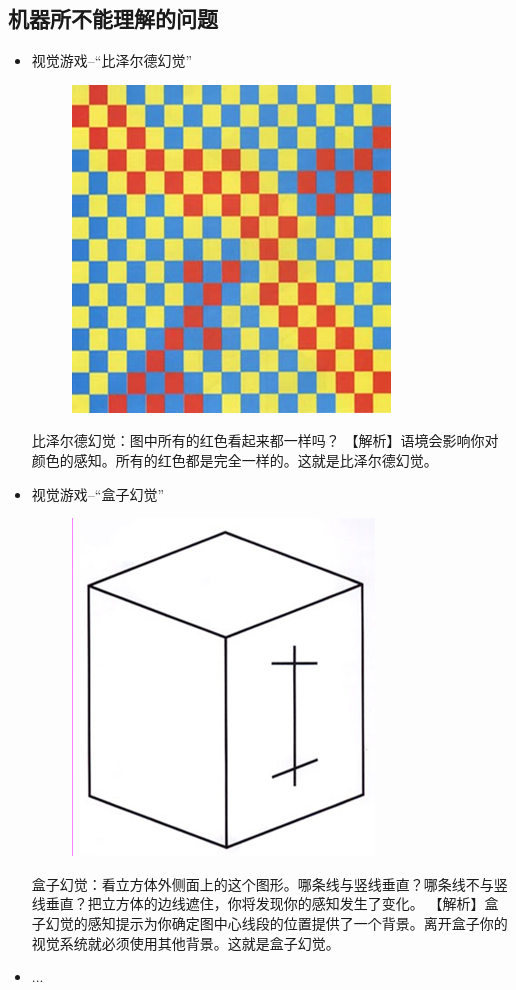 \documentclass[UTF8,a4paper]{ctexart}
\begin{document}
\subsection{机器所不能理解的问题}
\begin{itemize}
	\item 视觉游戏--“比泽尔德幻觉”
	      \begin{figure}[H]
		      \centering
		      \includegraphics[scale = 0.3]{assets/ArtificialIntelligence_9520f.png}
	      \end{figure}
	      比泽尔德幻觉：图中所有的红色看起来都一样吗？
	      【解析】语境会影响你对颜色的感知。所有的红色都是完全一样的。这就是比泽尔德幻觉。

	\item 视觉游戏--“盒子幻觉”
	      \begin{figure}[H]
		      \centering
		      \includegraphics[scale = 0.3]{assets/ArtificialIntelligence_30a23.png}
	      \end{figure}
	      盒子幻觉：看立方体外侧面上的这个图形。哪条线与竖线垂直？哪条线不与竖线垂直？把立方体的边线遮住，你将发现你的感知发生了变化。
	      【解析】盒子幻觉的感知提示为你确定图中心线段的位置提供了一个背景。离开盒子你的视觉系统就必须使用其他背景。这就是盒子幻觉。
	\item ...
\end{itemize}
\end{document}
